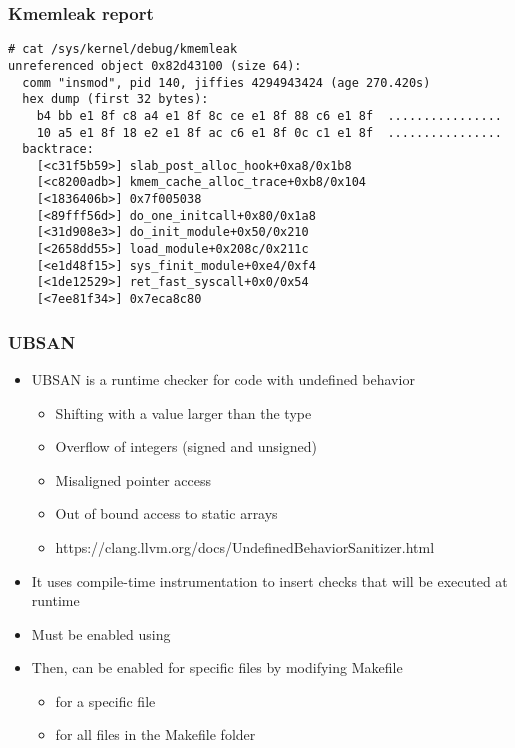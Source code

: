 \begin{frame}[fragile]
  \frametitle{Kmemleak report}
  \begin{block}{}
    \begin{verbatim}
# cat /sys/kernel/debug/kmemleak
unreferenced object 0x82d43100 (size 64):
  comm "insmod", pid 140, jiffies 4294943424 (age 270.420s)
  hex dump (first 32 bytes):
    b4 bb e1 8f c8 a4 e1 8f 8c ce e1 8f 88 c6 e1 8f  ................
    10 a5 e1 8f 18 e2 e1 8f ac c6 e1 8f 0c c1 e1 8f  ................
  backtrace:
    [<c31f5b59>] slab_post_alloc_hook+0xa8/0x1b8
    [<c8200adb>] kmem_cache_alloc_trace+0xb8/0x104
    [<1836406b>] 0x7f005038
    [<89fff56d>] do_one_initcall+0x80/0x1a8
    [<31d908e3>] do_init_module+0x50/0x210
    [<2658dd55>] load_module+0x208c/0x211c
    [<e1d48f15>] sys_finit_module+0xe4/0xf4
    [<1de12529>] ret_fast_syscall+0x0/0x54
    [<7ee81f34>] 0x7eca8c80
    \end{verbatim}
  \end{block}
\end{frame}

\begin{frame}
  \frametitle{UBSAN}
  \begin{itemize}
    \item UBSAN is a runtime checker for code with undefined behavior
    \begin{itemize}
      \item Shifting with a value larger than the type
      \item Overflow of integers (signed and unsigned)
      \item Misaligned pointer access
      \item Out of bound access to static arrays
      \item https://clang.llvm.org/docs/UndefinedBehaviorSanitizer.html
    \end{itemize}
    \item It uses compile-time instrumentation to insert checks that will be
          executed at runtime
    \item Must be enabled using 
    \item Then, can be enabled for specific files by modifying Makefile
    \begin{itemize}
      \item {} for a specific file
      \item {} for all files in the Makefile folder
    \end{itemize}
  \end{itemize}
\end{frame}

